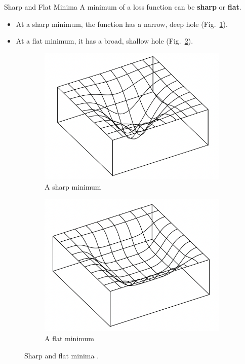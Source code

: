 \documentclass{beamer}
\begin{document}
\begin{frame}{Sharp and Flat Minima}
    A minimum of a loss function can be \textbf{sharp} or \textbf{flat}.
    \begin{itemize}
        \item At a sharp minimum, the function has a narrow, deep hole (Fig.~\ref{fig:sharp_minimum}).
        \item At a flat minimum, it has a broad, shallow hole (Fig.~\ref{fig:flat_minimum}).
    \end{itemize}
    
    \begin{figure}
        \centering
        \begin{subfigure}[b]{0.4\textwidth}
            \centering
            \includegraphics[width=\textwidth]{sharp_minimum}
            \caption{A sharp minimum}
            \label{fig:sharp_minimum}
        \end{subfigure}
        \begin{subfigure}[b]{0.4\textwidth}
            \centering
            \includegraphics[width=\textwidth]{flat_minimum}
            \caption{A flat minimum}
            \label{fig:flat_minimum}
        \end{subfigure}
        \caption{Sharp and flat minima \cite{pml2Book}.}
        \label{fig:sharp_and_flat_minima}
    \end{figure}
\end{frame}
\end{document}
